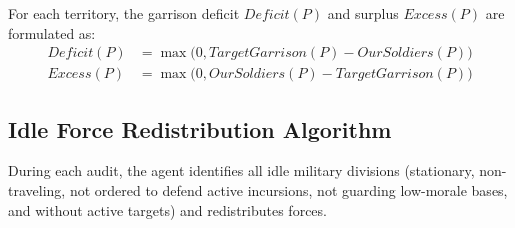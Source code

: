 For each territory, the garrison deficit $\mathit{Deficit}(P)$ and surplus $\mathit{Excess}(P)$ are formulated as:
\begin{align}
    \mathit{Deficit}(P) &= \max\Big(0, \mathit{TargetGarrison}(P) - \mathit{OurSoldiers}(P)\Big) \\
    \mathit{Excess}(P) &= \max\Big(0, \mathit{OurSoldiers}(P) - \mathit{TargetGarrison}(P)\Big)
\end{align}

\subsection{Idle Force Redistribution Algorithm}
\label{subsec:border_redistribution}

During each audit, the agent identifies all idle military divisions (stationary, non-traveling, not ordered to defend active incursions, not guarding low-morale bases, and without active targets) and redistributes forces.

